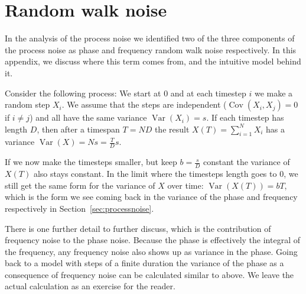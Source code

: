 \documentclass{article}
\DeclareMathOperator{\Var}{Var}
\DeclareMathOperator{\Cov}{Cov}
\begin{document}
\appendix
\section{Random walk noise}\label{sec:randomwalk}

In the analysis of the process noise we identified two of the three components of the process noise as phase and frequency random walk noise respectively. In this appendix, we discuss where this term comes from, and the intuitive model behind it.

Consider the following process: We start at 0 and at each timestep $i$ we make a random step $X_i$. We assume that the steps are independent ($\Cov(X_i, X_j) = 0$ if $i \ne j$) and all have the same variance $\Var(X_i) = s$. If each timestep has length $D$, then after a timespan $T = ND$ the result $X(T) = \sum_{i=1}^N X_i$ has a variance $\Var(X) = Ns = \frac{T}{D} s$.

If we now make the timesteps smaller, but keep $b = \frac{s}{D}$ constant the variance of $X(T)$ also stays constant. In the limit where the timesteps length goes to $0$, we still get the same form for the variance of $X$ over time: $\Var(X(T)) = bT$, which is the form we see coming back in the variance of the phase and frequency respectively in Section~\ref{sec:processnoise}.

There is one further detail to further discuss, which is the contribution of frequency noise to the phase noise. Because the phase is effectively the integral of the frequency, any frequency noise also shows up as variance in the phase. Going back to a model with steps of a finite duration the variance of the phase as a consequence of frequency noise can be calculated similar to above. We leave the actual calculation as an exercise for the reader.
\end{document}
